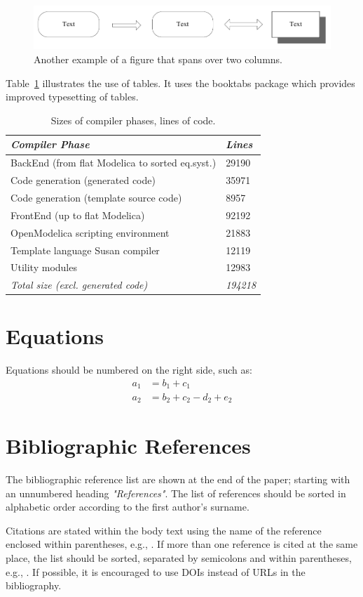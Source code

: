 \documentclass{modelica}
\begin{document}
\begin{figure}[t]
\centering
\includegraphics[width=0.9 \textwidth]{resources/figure2}
\caption{Another example of a figure that spans over two columns.}
\label{fig:figure2}
\end{figure}

Table~\ref{tab:extab} illustrates the use of tables. It uses the
booktabs package which provides improved typesetting of tables.
\begin{table}[htbp]
  \caption{Sizes of compiler phases, lines of code.}
  \label{tab:extab}
  \centering
  \begin{tabular}{p{6cm}l} \toprule
      \emph{Compiler Phase} & \emph{Lines} \\
      \midrule
      BackEnd (from flat Modelica to sorted eq.syst.) & 29190 \\
      Code generation (generated code) & 35971 \\
      Code generation (template source code) & 8957 \\
      FrontEnd (up to flat Modelica) & 92192 \\
      OpenModelica scripting environment & 21883 \\
      Template language Susan compiler & 12119 \\
      Utility modules & 12983 \\
      \emph{Total size (excl. generated code)} & \emph{194218} \\
      \bottomrule
  \end{tabular}
\end{table}

\section{Equations}
Equations should be numbered on the right side, such as:
\begin{align}
a_1& =b_1+c_1\\
a_2& =b_2+c_2-d_2+e_2
\end{align}


\section{Bibliographic References}
The bibliographic reference list are shown at the end of the paper;
starting with an unnumbered heading \emph{"References"}. The list of
references should be sorted in alphabetic order according to the first
author's surname.

Citations are stated within the body text using the name of the
reference enclosed within parentheses, e.g., \citep{Pantelides:1988}. If
more than one reference is cited at the same place, the list should be
sorted, separated by semicolons and within parentheses, e.g.,
\citep{DuffReid:1978,Pierce:2002,Plotkin:1981}. If possible, it is
encouraged to use DOIs instead of URLs in the bibliography.



\end{document}
